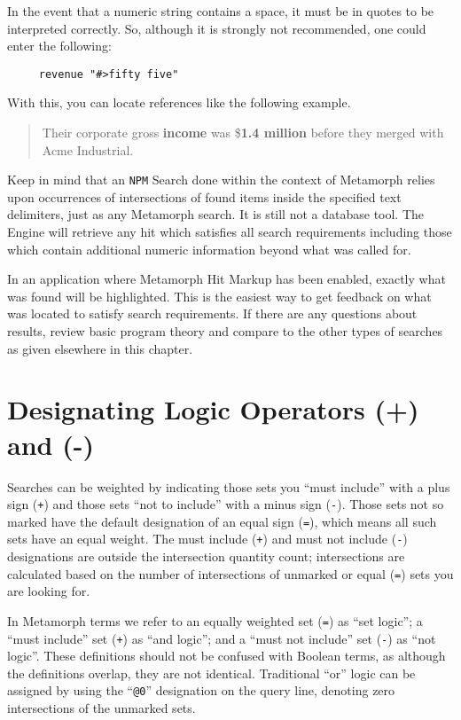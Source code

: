      In the event that a numeric string contains a space, it must be in quotes
to be interpreted correctly.  So, although it is strongly not recommended, one
could enter the following:
\begin{verbatim}
     revenue "#>fifty five"
\end{verbatim}
With this, you can locate references like the following example.

\begin{quote}
     Their corporate gross {\bf income} was \${\bf 1.4 million} before
     they merged with Acme Industrial.
\end{quote}

Keep in mind that an \verb`NPM` Search done within the context of
Metamorph relies upon occurrences of intersections of found items
inside the specified text delimiters, just as any Metamorph search.
It is still not a database tool.  The Engine will retrieve any hit
which satisfies all search requirements including those which contain
additional numeric information beyond what was called for.

In an application where Metamorph Hit Markup has been enabled, exactly
what was found will be highlighted.  This is the easiest way to get
feedback on what was located to satisfy search requirements.  If there
are any questions about results, review basic program theory and
compare to the other types of searches as given elsewhere in this
chapter.

\section{Designating Logic Operators (+) and (-)}

Searches can be weighted by indicating those sets you ``must include''
with a plus sign (\verb`+`) and those sets ``not to include'' with a
minus sign (\verb`-`).  Those sets not so marked have the default
designation of an equal sign (\verb`=`), which means all such sets
have an equal weight.  The must include (\verb`+`) and must not
include (\verb`-`) designations are outside the intersection quantity
count; intersections are calculated based on the number of
intersections of unmarked or equal (\verb`=`) sets you are looking
for.

In Metamorph terms we refer to an equally weighted set (\verb`=`) as
``set logic''; a ``must include'' set (\verb`+`) as ``and logic''; and
a ``must not include'' set (\verb`-`) as ``not logic''.  These
definitions should not be confused with Boolean terms, as although the
definitions overlap, they are not identical.  Traditional ``or'' logic
can be assigned by using the ``\verb`@0`'' designation on the query
line, denoting zero intersections of the unmarked sets.

